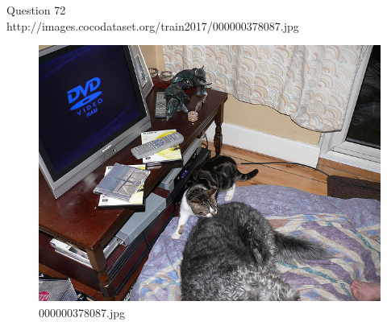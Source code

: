 Question 72\\
http://images.cocodataset.org/train2017/000000378087.jpg
\begin{figure}[h]
    \centering
    \includegraphics[width=0.8\linewidth]{../image set/hard/000000378087.jpg}
    \caption{000000378087.jpg}
\end{figure}
